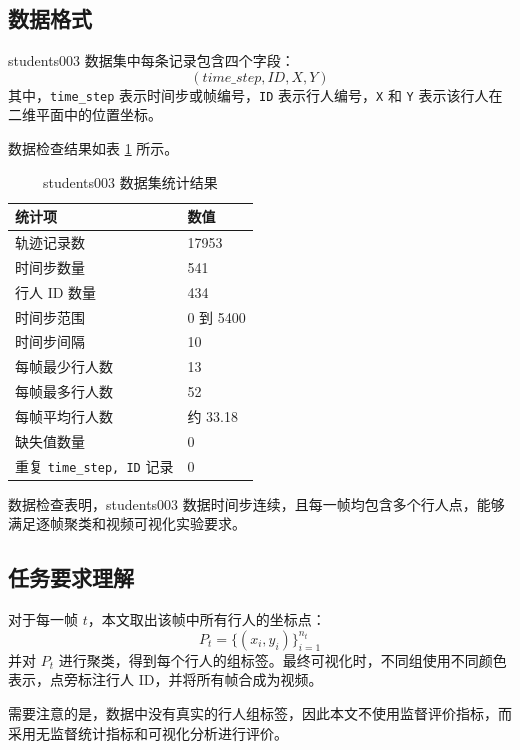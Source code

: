 \documentclass[UTF8,a4paper,12pt]{ctexart}
\begin{document}
\subsection{数据格式}

students003 数据集中每条记录包含四个字段：
\begin{equation}
    (time\_step, ID, X, Y)
\end{equation}
其中，\texttt{time\_step} 表示时间步或帧编号，\texttt{ID} 表示行人编号，\texttt{X} 和 \texttt{Y} 表示该行人在二维平面中的位置坐标。

数据检查结果如表 \ref{tab:dataset-summary} 所示。

\begin{table}[H]
\centering
\caption{students003 数据集统计结果}
\label{tab:dataset-summary}
\begin{tabular}{ll}
\toprule
统计项 & 数值 \\
\midrule
轨迹记录数 & 17953 \\
时间步数量 & 541 \\
行人 ID 数量 & 434 \\
时间步范围 & 0 到 5400 \\
时间步间隔 & 10 \\
每帧最少行人数 & 13 \\
每帧最多行人数 & 52 \\
每帧平均行人数 & 约 33.18 \\
缺失值数量 & 0 \\
重复 \texttt{time\_step, ID} 记录 & 0 \\
\bottomrule
\end{tabular}
\end{table}

数据检查表明，students003 数据时间步连续，且每一帧均包含多个行人点，能够满足逐帧聚类和视频可视化实验要求。

\subsection{任务要求理解}

对于每一帧 $t$，本文取出该帧中所有行人的坐标点：
\begin{equation}
P_t = \{(x_i, y_i)\}_{i=1}^{n_t}
\end{equation}
并对 $P_t$ 进行聚类，得到每个行人的组标签。最终可视化时，不同组使用不同颜色表示，点旁标注行人 ID，并将所有帧合成为视频。

需要注意的是，数据中没有真实的行人组标签，因此本文不使用监督评价指标，而采用无监督统计指标和可视化分析进行评价。
\end{document}

